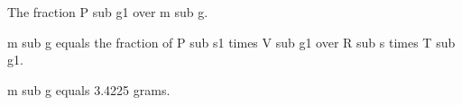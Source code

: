 The fraction P sub g1 over m sub g.

m sub g equals the fraction of P sub s1 times V sub g1 over R sub s times T sub g1.

m sub g equals 3.4225 grams.